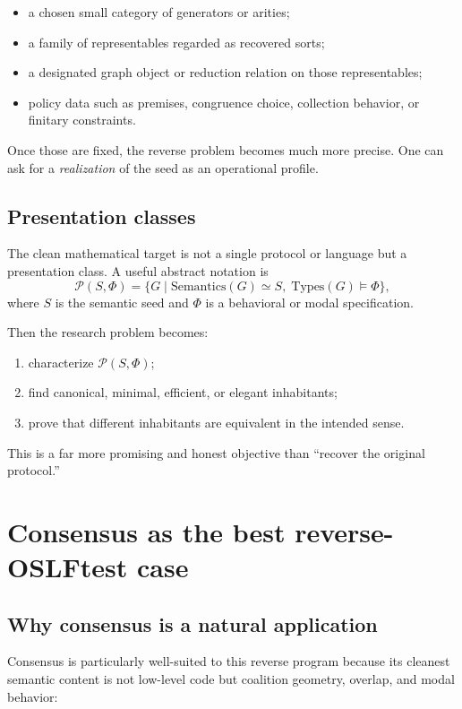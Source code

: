 \documentclass[11pt]{article}
\newcommand{\OSLF}{OSLF}
\begin{document}
\begin{itemize}
  \item a chosen small category of generators or arities;
  \item a family of representables regarded as recovered sorts;
  \item a designated graph object or reduction relation on those representables;
  \item policy data such as premises, congruence choice, collection behavior, or finitary constraints.
\end{itemize}

Once those are fixed, the reverse problem becomes much more precise. One can ask for a \emph{realization} of the seed as an operational profile.

\subsection{Presentation classes}

The clean mathematical target is not a single protocol or language but a presentation class. A useful abstract notation is
\[
\mathcal{P}(S,\Phi)
= \{ G \mid \mathrm{Semantics}(G) \simeq S,\; \mathrm{Types}(G) \models \Phi \},
\]
where $S$ is the semantic seed and $\Phi$ is a behavioral or modal specification.

Then the research problem becomes:

\begin{enumerate}
  \item characterize $\mathcal{P}(S,\Phi)$;
  \item find canonical, minimal, efficient, or elegant inhabitants;
  \item prove that different inhabitants are equivalent in the intended sense.
\end{enumerate}

This is a far more promising and honest objective than ``recover the original protocol.''

\section{Consensus as the best reverse-\OSLF test case}

\subsection{Why consensus is a natural application}

Consensus is particularly well-suited to this reverse program because its cleanest semantic content is not low-level code but coalition geometry, overlap, and modal behavior:
\end{document}
